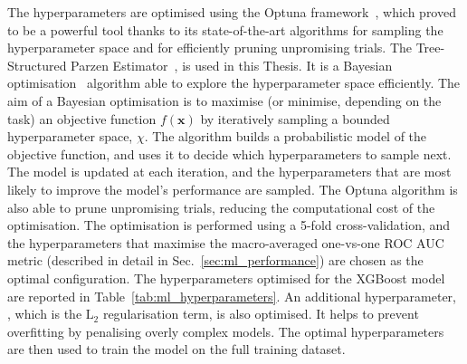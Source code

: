The hyperparameters are optimised using the Optuna framework~\cite{akiba2019optuna}, which proved to be a powerful tool thanks to its state-of-the-art algorithms for sampling the hyperparameter space and for efficiently pruning unpromising trials. The Tree-Structured Parzen Estimator~\cite{bergstra2011algorithms}, is used in this Thesis. It is a Bayesian optimisation~\cite{frazier2018tutorial,snoek2012practical} algorithm able to explore the hyperparameter space efficiently. The aim of a Bayesian optimisation is to maximise (or minimise, depending on the task) an objective function $f(\mathbf{x})$ by iteratively sampling a bounded hyperparameter space, $\chi$. The algorithm builds a probabilistic model of the objective function, and uses it to decide which hyperparameters to sample next. The model is updated at each iteration, and the hyperparameters that are most likely to improve the model's performance are sampled. The Optuna algorithm is also able to prune unpromising trials, reducing the computational cost of the optimisation. The optimisation is performed using a 5-fold cross-validation, and the hyperparameters that maximise the macro-averaged one-vs-one ROC AUC metric (described in detail in Sec.~\ref{sec:ml_performance}) are chosen as the optimal configuration. The hyperparameters optimised for the XGBoost model are reported in Table~\ref{tab:ml_hyperparameters}. An additional hyperparameter, , which is the $\mathrm{L_2}$ regularisation term, is also optimised. It helps to prevent overfitting by penalising overly complex models. The optimal hyperparameters are then used to train the model on the full training dataset.

